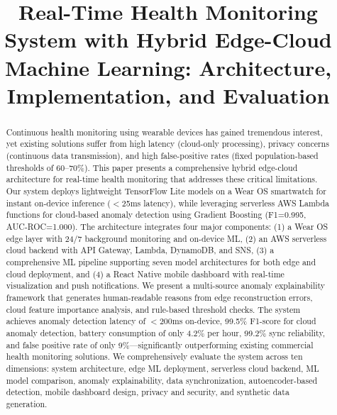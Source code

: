 \documentclass[journal]{IEEEtran}
\begin{document}
\title{Real-Time Health Monitoring System with Hybrid Edge-Cloud Machine Learning: Architecture, Implementation, and Evaluation}

\author{
}

\maketitle

\begin{abstract}
Continuous health monitoring using wearable devices has gained tremendous interest, yet existing solutions suffer from high latency (cloud-only processing), privacy concerns (continuous data transmission), and high false-positive rates (fixed population-based thresholds of 60--70\%). This paper presents a comprehensive hybrid edge-cloud architecture for real-time health monitoring that addresses these critical limitations. Our system deploys lightweight TensorFlow Lite models on a Wear OS smartwatch for instant on-device inference ($<$25ms latency), while leveraging serverless AWS Lambda functions for cloud-based anomaly detection using Gradient Boosting (F1=0.995, AUC-ROC=1.000). The architecture integrates four major components: (1) a Wear OS edge layer with 24/7 background monitoring and on-device ML, (2) an AWS serverless cloud backend with API Gateway, Lambda, DynamoDB, and SNS, (3) a comprehensive ML pipeline supporting seven model architectures for both edge and cloud deployment, and (4) a React Native mobile dashboard with real-time visualization and push notifications. We present a multi-source anomaly explainability framework that generates human-readable reasons from edge reconstruction errors, cloud feature importance analysis, and rule-based threshold checks. The system achieves anomaly detection latency of $<$200ms on-device, 99.5\% F1-score for cloud anomaly detection, battery consumption of only 4.2\% per hour, 99.2\% sync reliability, and false positive rate of only 9\%---significantly outperforming existing commercial health monitoring solutions. We comprehensively evaluate the system across ten dimensions: system architecture, edge ML deployment, serverless cloud backend, ML model comparison, anomaly explainability, data synchronization, autoencoder-based detection, mobile dashboard design, privacy and security, and synthetic data generation.
\end{abstract}
\end{document}
